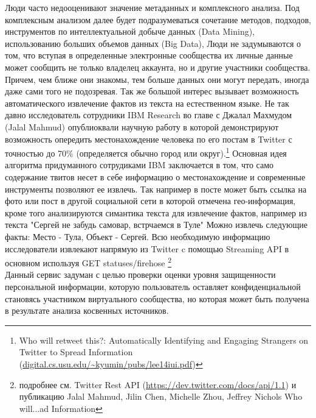 Люди часто недооценивают значение метаданных и комплексного анализа. 
Под комплексным анализом далее будет подразумеваться сочетание методов, подходов, инструментов по интеллектуальной добыче данных (Data Mining), %
использованию больших объемов данных (Big Data), 
Люди не задумываются о том, что вступая в определенные электронные сообщества их личные данные может сообщить не только владелец аккаунта, но и другие участники сообщества. Причем, чем ближе они знакомы, тем больше данных они могут передать, иногда даже сами того не подозревая. Так же большой интерес вызывает возможность автоматического извлечение фактов из текста на естественном языке. Не так давно исследователь сотрудники IBM Research во главе с Джалал Махмудом (Jalal Mahmud) опублиоквали научную работу в которой демонстрируют возможность опередить местонахождение человека по его постам в Twitter с точностью до 70\% (определяется обычно город или округ).\footnote{Who will retweet this?: Automatically Identifying and Engaging Strangers on Twitter to Spread Information (\url{digital.cs.usu.edu/~kyumin/pubs/lee14iui.pdf‎})}
 Основная идея алгоритма придуманного сотрудиками IBM заключается в том, что само содержание твитов несет в себе информацию о местонахождение и современные  инструменты  позволяют ее извлечь. Так например в посте может быть ссылка на фото или пост в другой социальной сети в которой отмечена гео-информация, кроме того анализируются симантика текста для извлечение фактов, например из текста "Сергей не забудь самовар, встрчаемся в Туле" Можно извлечь следующие факты: Место - Тула, Объект - Сергей. Всю необходимую информацию исследователи извлекают напрямую из Twitter c помощью Streaming API в основном используя GET statuses/firehose \footnote{подробнее см. Twitter Rest API (\url{https://dev.twitter.com/docs/api/1.1}) и публикацию Jalal Mahmud, Jilin Chen, Michelle Zhou, Jeffrey Nichols Who will...ad Information} \\



Данный сервис задуман с целью проверки оценки уровня защищенности персональной информации, которую пользователь оставляет конфиденциальной становясь участником виртуального сообщества, но которая может быть получена в результате анализа косвенных источников. \\

